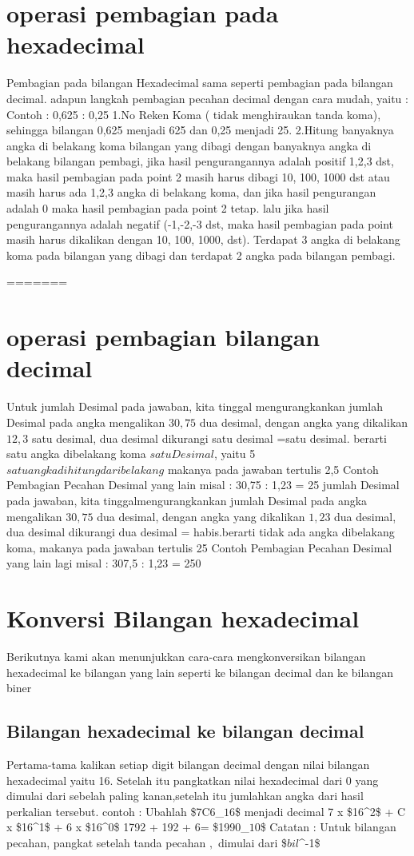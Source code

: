 \section {operasi pembagian pada hexadecimal}
Pembagian pada bilangan Hexadecimal sama seperti pembagian pada bilangan decimal. adapun langkah pembagian pecahan decimal dengan cara mudah, yaitu :
	Contoh : 0,625 : 0,25
	1.No Reken Koma ( tidak menghiraukan tanda koma), sehingga bilangan 0,625 menjadi 625 dan 0,25 menjadi 25.
	2.Hitung banyaknya angka di belakang koma bilangan yang dibagi dengan banyaknya angka di belakang bilangan pembagi, jika hasil pengurangannya adalah positif 1,2,3 dst, maka hasil pembagian pada point 2 masih harus dibagi 10, 100, 1000 dst atau masih harus ada 1,2,3 angka di belakang koma, dan jika hasil pengurangan adalah 0 maka hasil pembagian pada point 2 tetap. lalu jika hasil pengurangannya adalah negatif (-1,-2,-3 dst, maka hasil pembagian pada point masih harus dikalikan dengan 10, 100, 1000, dst). Terdapat 3 angka di belakang koma pada bilangan yang dibagi dan terdapat 2 angka pada bilangan pembagi. 

=======
\section{operasi pembagian bilangan decimal}
Untuk jumlah Desimal pada jawaban, kita tinggal mengurangkankan jumlah Desimal pada angka mengalikan \(30,75\) dua desimal, 
dengan angka yang dikalikan \(12,3\) satu desimal, 
dua desimal dikurangi satu desimal =satu desimal. berarti satu angka dibelakang koma \(satu Desimal\), yaitu 5 \(satu angka dihitung dari belakang\) makanya pada jawaban tertulis 2,5
 Contoh Pembagian Pecahan Desimal yang lain misal : 
 30,75 : 1,23 = 25
jumlah Desimal pada jawaban, kita tinggalmengurangkankan jumlah Desimal pada angka mengalikan \(30,75\) dua desimal, 
dengan angka yang dikalikan \(1,23\) dua desimal, 
dua desimal dikurangi dua desimal = habis.berarti tidak ada angka dibelakang koma, makanya pada jawaban tertulis 25
 Contoh Pembagian Pecahan Desimal yang lain lagi misal : 
 307,5 : 1,23 = 250
\section{Konversi Bilangan hexadecimal}
Berikutnya kami akan menunjukkan cara-cara mengkonversikan bilangan hexadecimal ke bilangan yang lain seperti ke bilangan decimal dan ke bilangan biner
\subsection{Bilangan hexadecimal ke bilangan decimal}
Pertama-tama kalikan setiap digit bilangan decimal dengan nilai bilangan hexadecimal yaitu 16. Setelah itu pangkatkan nilai hexadecimal dari 0 yang dimulai dari sebelah paling kanan,setelah itu jumlahkan angka dari hasil perkalian tersebut.
contoh : 
Ubahlah \$7C6_\(16\)\$ menjadi decimal
		7 x \$16^2\$ + C x \$16^1\$ + 6 x \$16^0\$
		1792 + 192 + 6= \$1990_\(10\)\$
Catatan : Untuk bilangan pecahan, pangkat setelah tanda pecahan \(,\) dimulai dari \$\(bil\)^-1\$

